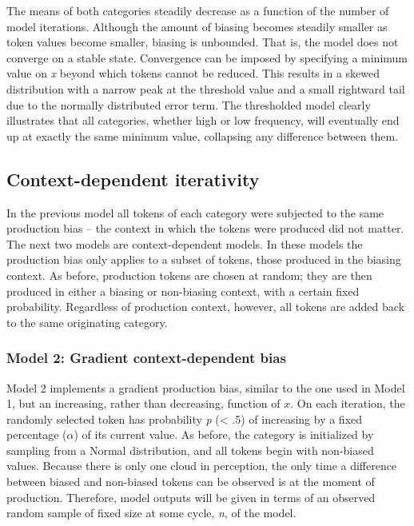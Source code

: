 The means of both categories steadily decrease as a function of the
number of model iterations. Although the amount of biasing becomes
steadily smaller as token values become smaller, biasing is unbounded.
That is, the model does not converge on a stable state. Convergence
can be imposed by specifying a minimum value on \emph{x} beyond which
tokens cannot be reduced. This results in a skewed distribution with
a narrow peak at the threshold value and a small rightward tail due
to the normally distributed error term. The thresholded model clearly
illustrates that all categories, whether high or low frequency, will
eventually end up at exactly the same minimum value, collapsing any
difference between them. 

\subsection{\label{sec:Context-Dependent-Iterativity}Context-dependent iterativity}

In the previous model all tokens of each category were subjected to
the same production bias – the context in which the tokens were produced
did not matter. The next two models are context-dependent models.
In these models the production bias only applies to a subset of tokens,
those produced in the biasing context. As before, production tokens
are chosen at random; they are then produced in either a biasing or
non-biasing context, with a certain fixed probability. Regardless
of production context, however, all tokens are added back to the same
originating category.

\subsubsection{\label{subsec:Phrase-Final Lengthening}Model 2: Gradient context-dependent bias}

Model 2 implements a gradient production bias, similar to the one
used in Model 1, but an increasing, rather than decreasing, function
of $x$. On each iteration, the randomly selected token has probability
\emph{p} (< .5) of increasing by a fixed percentage ($\alpha$) of
its current value. As before, the category is initialized by sampling
from a Normal distribution, and all tokens begin with non-biased values.
Because there is only one cloud in perception, the only time a difference
between biased and non-biased tokens can be observed is at the moment
of production. Therefore, model outputs will be given in terms of
an observed random sample of fixed size at some cycle, \emph{n}, of
the model.

